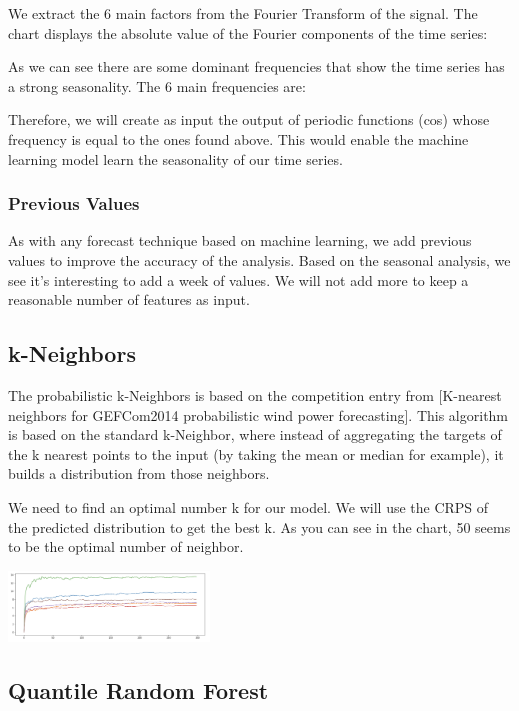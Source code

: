 \documentclass[a4paper,twocolumn,5p]{elsarticle}
\begin{document}
We extract the 6 main factors from the Fourier Transform of the signal. The chart displays the absolute value of
the Fourier components of the time series:

As we can see there are some dominant frequencies that show the time series has a strong seasonality. The 6 main 
frequencies are:


Therefore, we will create as input the output of periodic functions (cos) whose frequency is equal to the ones found 
above. This would enable the machine learning model learn the seasonality of our time series.

\subsubsection{Previous Values}

As with any forecast technique based on machine learning, we add previous values to improve the accuracy 
of the analysis. Based on the seasonal analysis, we see it's interesting to add a week of values. We will not 
add more to keep a reasonable number of features as input.

\subsection{k-Neighbors}

The probabilistic k-Neighbors is based on the competition entry from 
[K-nearest neighbors for GEFCom2014 probabilistic wind power forecasting]. 
This algorithm is based on the standard k-Neighbor, where instead of aggregating the targets of the
k nearest points to the input (by taking the mean or median for example), it builds a distribution 
from those neighbors.

We need to find an optimal number k for our model. We will use the CRPS of the predicted distribution
to get the best k. As you can see in the chart, 50 seems to be the optimal 
number of neighbor.

\includegraphics[width=0.4\textwidth]{kneighbor_crps}

\subsection{Quantile Random Forest}
\end{document}
